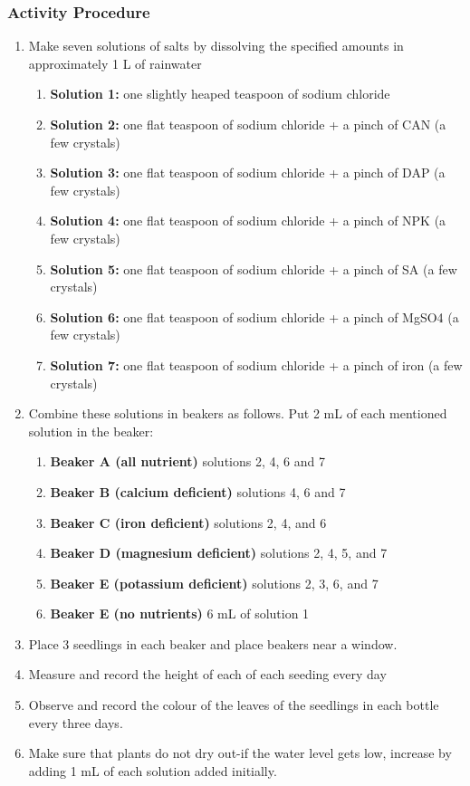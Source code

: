 \subsubsection*{Activity Procedure}
\begin{enumerate}
\item{Make seven solutions of salts by dissolving the specified amounts in approximately 1 L of rainwater}
\begin{enumerate}
\item{\textbf{Solution 1:} one slightly heaped teaspoon of  sodium chloride}
\item{\textbf{Solution 2:} one flat teaspoon of sodium chloride + a pinch of CAN (a few crystals)}
\item{\textbf{Solution 3:} one flat teaspoon of  sodium chloride + a pinch of DAP (a few crystals)}
\item{\textbf{Solution 4:} one flat teaspoon of sodium chloride + a pinch of NPK (a few crystals)}
\item{\textbf{Solution 5:} one flat teaspoon of sodium chloride + a pinch of SA (a few crystals)}
\item{\textbf{Solution 6:} one flat teaspoon of sodium chloride + a pinch of MgSO4 (a few crystals)}
\item{\textbf{Solution 7:} one flat teaspoon of sodium chloride + a pinch of iron (a few crystals)}
\end{enumerate}
\item{Combine these solutions in beakers as follows. Put 2 mL of each mentioned solution in the beaker:}
\begin{enumerate}
\item{\textbf{Beaker A (all nutrient)} solutions 2, 4, 6 and 7}
\item{\textbf{Beaker B (calcium deficient)} solutions 4, 6 and 7}
\item{\textbf{Beaker C (iron deficient)} solutions 2, 4, and 6}
\item{\textbf{Beaker D (magnesium deficient)} solutions 2, 4, 5, and 7}
\item{\textbf{Beaker E (potassium deficient)} solutions 2, 3, 6, and 7}
\item{\textbf{Beaker E (no nutrients)}  6 mL of solution 1}
\end{enumerate}
\item{Place 3 seedlings in each beaker and place beakers near a window.}
\item{Measure and record the height of each of each seeding every day}
\item{Observe and record the colour of the leaves of the seedlings in each bottle every three days.}
\item{Make sure that plants do not dry out-if the water level gets low, increase by adding 1 mL of each solution added initially.}
\end{enumerate}

